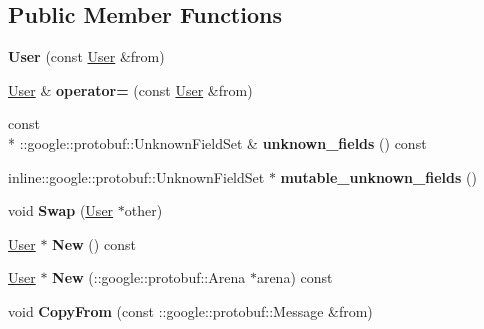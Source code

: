 \subsection*{Public Member Functions}
\begin{DoxyCompactItemize}
\item 
\hypertarget{classSimpleChat_1_1User_af9d0c6966cc6131f24f689a2bb375562}{{\bfseries User} (const \hyperlink{classSimpleChat_1_1User}{User} \&from)}\label{classSimpleChat_1_1User_af9d0c6966cc6131f24f689a2bb375562}

\item 
\hypertarget{classSimpleChat_1_1User_aa62b1c0d29848bd524e819e174ea1b1d}{\hyperlink{classSimpleChat_1_1User}{User} \& {\bfseries operator=} (const \hyperlink{classSimpleChat_1_1User}{User} \&from)}\label{classSimpleChat_1_1User_aa62b1c0d29848bd524e819e174ea1b1d}

\item 
\hypertarget{classSimpleChat_1_1User_a74b47afc5050689cd12f8636d4a810cb}{const \\*
\-::google\-::protobuf\-::\-Unknown\-Field\-Set \& {\bfseries unknown\-\_\-fields} () const }\label{classSimpleChat_1_1User_a74b47afc5050689cd12f8636d4a810cb}

\item 
\hypertarget{classSimpleChat_1_1User_a89dd64bea6c553f3f803dab24a574acf}{inline\-::google\-::protobuf\-::\-Unknown\-Field\-Set $\ast$ {\bfseries mutable\-\_\-unknown\-\_\-fields} ()}\label{classSimpleChat_1_1User_a89dd64bea6c553f3f803dab24a574acf}

\item 
\hypertarget{classSimpleChat_1_1User_a7f64a6a4a7822d6a4d6dd8c3bc50132f}{void {\bfseries Swap} (\hyperlink{classSimpleChat_1_1User}{User} $\ast$other)}\label{classSimpleChat_1_1User_a7f64a6a4a7822d6a4d6dd8c3bc50132f}

\item 
\hypertarget{classSimpleChat_1_1User_ad6f7d285ea1db8b4d75de142f2b218e1}{\hyperlink{classSimpleChat_1_1User}{User} $\ast$ {\bfseries New} () const }\label{classSimpleChat_1_1User_ad6f7d285ea1db8b4d75de142f2b218e1}

\item 
\hypertarget{classSimpleChat_1_1User_ac6217a2abfe98ad2a6f2e15eee50d529}{\hyperlink{classSimpleChat_1_1User}{User} $\ast$ {\bfseries New} (\-::google\-::protobuf\-::\-Arena $\ast$arena) const }\label{classSimpleChat_1_1User_ac6217a2abfe98ad2a6f2e15eee50d529}

\item 
\hypertarget{classSimpleChat_1_1User_a867e04629c0c511b24a5da8c0449437c}{void {\bfseries Copy\-From} (const \-::google\-::protobuf\-::\-Message \&from)}\label{classSimpleChat_1_1User_a867e04629c0c511b24a5da8c0449437c}


\end{DoxyCompactItemize}
